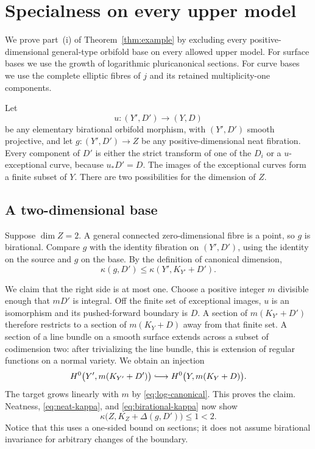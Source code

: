 \section{Specialness on every upper model}\label{sec:specialness}

We prove part~(i) of Theorem~\ref{thm:example} by excluding every
positive-dimensional general-type orbifold base on every allowed upper
model. For surface bases we use the growth of logarithmic
pluricanonical sections. For curve bases we use the complete elliptic
fibres of $j$ and its retained multiplicity-one components.

Let
\[
 u:(Y',D')\longrightarrow(Y,D)
\]
be any elementary birational orbifold morphism, with $(Y',D')$ smooth
projective, and let $g:(Y',D')\to Z$ be any positive-dimensional neat
fibration. Every component of $D'$ is either the strict transform of one
of the $D_i$ or a $u$-exceptional curve, because $u_*D'=D$. The images of
the exceptional curves form a finite subset of $Y$. There are two
possibilities for the dimension of $Z$.

\subsection{A two-dimensional base}
Suppose $\dim Z=2$. A general connected zero-dimensional fibre is a point,
so $g$ is birational. Compare $g$ with the identity fibration on
$(Y',D')$, using the identity on the source and $g$ on the base. By the
definition of canonical dimension,
\begin{equation}\label{eq:birational-kappa}
 \kappa(g,D')\leq\kappa(Y',K_{Y'}+D').
\end{equation}

We claim that the right side is at most one. Choose a positive integer
$m$ divisible enough that $mD'$ is integral. Off the finite set of
exceptional images, $u$ is an isomorphism and its pushed-forward
boundary is $D$. A section of $m(K_{Y'}+D')$ therefore restricts to a
section of $m(K_Y+D)$ away from that finite set. A section of a line
bundle on a smooth surface extends across a subset of codimension two:
after trivializing the line bundle, this is extension of regular
functions on a normal variety. We obtain an injection
\begin{equation}\label{eq:section-injection}
 H^0\bigl(Y',m(K_{Y'}+D')\bigr)
   \lhook\joinrel\longrightarrow
 H^0\bigl(Y,m(K_Y+D)\bigr).
\end{equation}
The target grows linearly with $m$ by \eqref{eq:log-canonical}. This proves
the claim. Neatness, \eqref{eq:neat-kappa}, and
\eqref{eq:birational-kappa} now show
\[
 \kappa\bigl(Z,K_Z+\Delta(g,D')\bigr)\leq1<2.
\]
Notice that this uses a one-sided bound on sections; it does not assume
birational invariance for arbitrary changes of the boundary.

